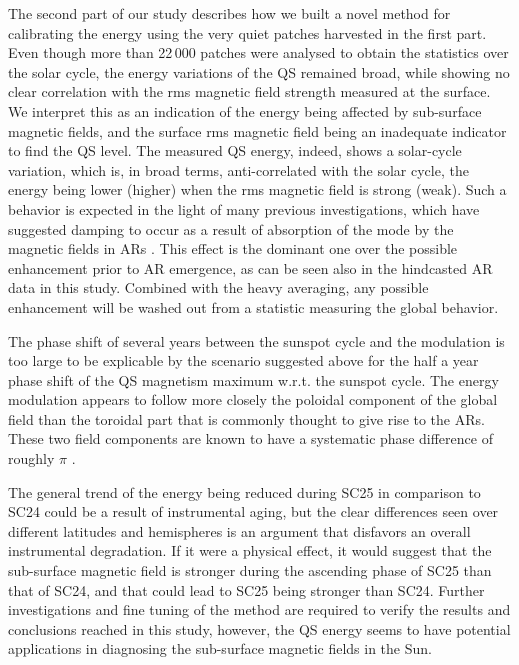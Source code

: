 \documentclass{aa}
\begin{document}
The second part of our study describes how we built a novel method for calibrating the \fff energy using the very quiet patches harvested in the first part. Even though more than 22\,000 patches were analysed to obtain the statistics over the solar cycle, the \fff energy variations of the QS remained broad, while showing no clear correlation with the 
rms magnetic field strength
measured at the surface. We interpret this as an indication of the \fff energy being affected by sub-surface magnetic fields, and the surface rms magnetic field being an inadequate indicator to find the QS level. 
The measured QS \fff energy, indeed, shows a solar-cycle variation, which is, in broad terms, anti-correlated with the solar cycle, the \fff energy being lower (higher) when the
rms
magnetic field is strong (weak).
Such a behavior is expected in the light of many previous investigations, which have suggested \fff damping to occur as a result of absorption of the \fff mode by the magnetic fields in ARs \citep{Cally+94,CB97,SRB16}. This effect is the dominant one over the
possible enhancement prior to AR emergence,
as can be seen also in the hindcasted AR data in this 
study. Combined with the heavy averaging, any possible enhancement 
will be washed out from a statistic measuring the global behavior.

The phase shift of several years between the sunspot cycle and the \fff modulation is too large to be explicable by the scenario suggested above for the half a year phase shift of the QS magnetism maximum w.r.t. the sunspot cycle. The \fff energy modulation appears to follow more closely the poloidal component of the global field than the toroidal part that is commonly thought to give rise to the ARs. These two field components are known to have a systematic phase difference of roughly $\pi$ \cite[see, e.g.,][]{char10}. 

The general trend of the \fff energy being reduced during SC25 in comparison to SC24 could be a result of instrumental aging, but the clear differences seen over different latitudes and hemispheres is an argument that disfavors an overall instrumental degradation. If it were a physical effect, it would suggest that the sub-surface magnetic field is stronger during the ascending phase of SC25 than that of SC24, and that could lead to SC25 being stronger than SC24. Further investigations and fine tuning of the method are required to verify the results and conclusions reached in this study, however, the QS \fff energy seems to have potential applications in diagnosing the sub-surface magnetic fields in the Sun.
\end{document}
